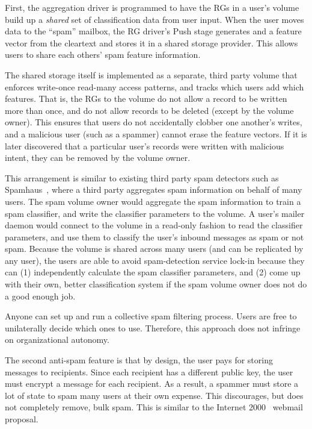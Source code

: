First, the aggregation driver is programmed to have the RGs in a user's volume build
up a \emph{shared} set of classification data from user input.  When the user
moves data to the ``spam'' mailbox, the RG driver's Push stage generates and
a feature vector from the cleartext and stores it in a shared storage
provider.  This allows
users to share each others' spam feature information.

The shared storage itself is implemented as a separate, third party volume that enforces write-once read-many
access patterns, and tracks which users add which features.  That is, the RGs to the volume do not allow a record to be
written more than once, and do not allow records to be deleted (except by the
volume owner).  This ensures
that users do not accidentally clobber one another's writes, and a malicious
user (such as a spammer) cannot erase the feature vectors.  If it is later
discovered that a particular user's records were written with malicious intent,
they can be removed by the volume owner.

This arrangement is similar to existing third party spam detectors such as
Spamhaus~\cite{spamhaus}, where a third party aggregates spam information 
on behalf of many users.  The spam volume owner would aggregate the spam
information to train a spam classifier, and write the classifier parameters
to the volume.  A user's mailer daemon would connect to the volume in a read-only fashion
to read the classifier parameters, and use them to classify the user's inbound
messages as spam or not spam.  Because the volume is shared across many users
(and can be replicated by any user), the users are able to avoid spam-detection
service lock-in because they can (1) independently calculate the spam classifier
parameters, and (2) come up with their own, better classification system if the
spam volume owner does not do a good enough job.

Anyone can set up and run a collective spam filtering process.  Users are free
to unilaterally decide which ones to use.  Therefore, this approach does not
infringe on organizational autonomy.

\hfill \break
{}
\hfill \break

The second anti-spam feature is that by design, the user pays for storing messages to recipients.  Since each
recipient has a different public key, the user must encrypt a message for each
recipient.  As a result, a spammer
must store a lot of state to spam many users at their own expense.  This
discourages, but does not completely remove, bulk spam.  This is similar to
the Internet 2000~\cite{internet2000} webmail proposal.

